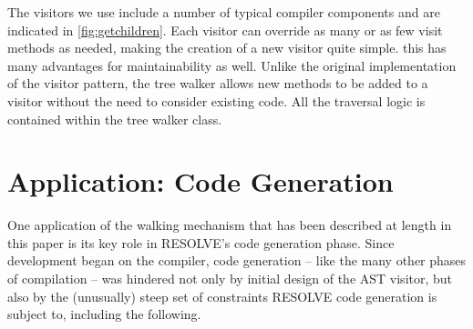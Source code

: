 \documentclass[times]{speauth}
\begin{document}
The visitors we use include a number of typical compiler components and are indicated in \ref{fig:getchildren}. Each visitor can override as many or as few visit methods as needed, making the creation of a new visitor quite simple. this has many advantages for maintainability as well. Unlike the original implementation of the visitor pattern, the tree walker allows new methods to be added to a visitor without the need to consider existing code. All the traversal logic is contained within the tree walker class. 


\section{Application: Code Generation}
\vspace{-2pt}

One application of the walking mechanism that has been described at length in this paper is its key role in RESOLVE's code generation phase. Since development began on the compiler, code generation -- like the many other phases of compilation -- was hindered not only by initial design of the AST visitor, but also by the (unusually) steep set of constraints RESOLVE code generation is subject to, including the following.
\end{document}
